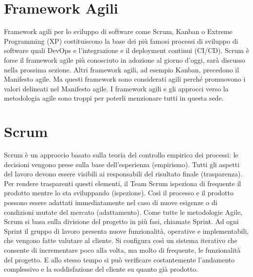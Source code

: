 \documentclass[a4paper,12pt,titlepage,oneside]{book}
\begin{document}
\section{Framework Agili}
    Framework agili per lo sviluppo di software come Scrum, Kanban o Extreme Programming (XP) costituiscono la base dei più famosi processi di sviluppo di software quali DevOps e l'integrazione e il deployment continui (CI/CD).
    Scrum è forse il framework agile più conosciuto in adozione al giorno d'oggi, sarà discusso nella prossima sezione.
    Altri framework agili, ad esempio Kanban, precedono il Manifesto agile. Ma questi framework sono considerati agili perché promuovono i valori delineati nel Manifesto agile. I framework agili e gli approcci verso la metodologia agile sono troppi per poterli menzionare tutti in questa sede.

\section{Scrum}
    Scrum è un approccio basato sulla teoria del controllo empirico dei processi: le decisioni vengono prese sulla base dell’esperienza (empirismo).
    Tutti gli aspetti del lavoro devono essere visibili ai responsabili del risultato finale (trasparenza). Per rendere trasparenti questi elementi, il Team Scrum ispeziona di frequente il prodotto mentre lo sta sviluppando (ispezione). Così il processo e il prodotto possono essere adattati 
    immediatamente nel caso di nuove esigenze o di condizioni mutate del mercato (adattamento).
    Come tutte le metodologie Agile, Scrum si basa sulla divisione del progetto in più fasi, chiamate Sprint.
    Ad ogni Sprint il gruppo di lavoro presenta nuove funzionalità, operative e implementabili, che vengono fatte valutare al cliente. Si configura così un sistema iterativo che consente di incrementare poco alla volta, ma molto di frequente, le funzionalità del progetto.
    E allo stesso tempo si può verificare costantemente l’andamento complessivo e la soddisfazione del cliente su quanto già prodotto.
\end{document}
